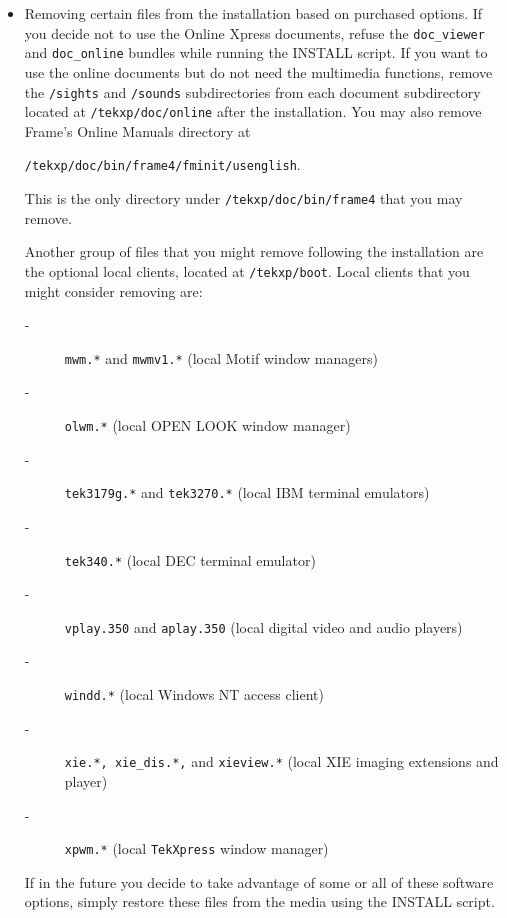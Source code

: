 \documentclass[11pt]{article}
\begin{document}
\begin {itemize}
\item Removing certain files from the installation based on purchased options.
If you decide not to use the Online Xpress documents, refuse the
{\tt doc\_viewer} and {\tt doc\_online} bundles while running the INSTALL
script. If you want to use the online documents but do not need the
multimedia functions, remove the
{\tt /sights} and {\tt /sounds} subdirectories from each document subdirectory
located at {\tt /tekxp/doc/online} after the installation. You
may also remove Frame's Online Manuals directory at

{\tt /tekxp/doc/bin/frame4/fminit/usenglish}.

This is the only directory under {\tt /tekxp/doc/bin/frame4}
that you may remove.

Another group of files that you might remove following the installation are the
optional local clients, located at {\tt /tekxp/boot}. Local clients that you
might consider removing are:

\begin {description}

\item [-\ \ ] {\tt mwm.*} and {\tt mwmv1.*} (local Motif window managers)

\item [-\ \ ] {\tt olwm.*} (local OPEN LOOK window manager)

\item [-\ \ ] {\tt tek3179g.*} and {\tt tek3270.*} (local IBM terminal emulators)

\item [-\ \ ] {\tt tek340.*} (local DEC terminal emulator)

\item [-\ \ ] {\tt vplay.350} and {\tt aplay.350} (local digital video and
audio players)

\item [-\ \ ] {\tt windd.*} (local Windows NT access client)

\item [-\ \ ] {\tt xie.*, xie\_dis.*,} and {\tt xieview.*} (local XIE imaging
extensions and player)

\item [-\ \ ] {\tt xpwm.*} (local {\tt TekXpress} window manager)

\end {description}

If in the future you decide to take advantage of some or all of these software
options, simply restore these files from the media using the INSTALL script.

\end {itemize}
\end{document}
